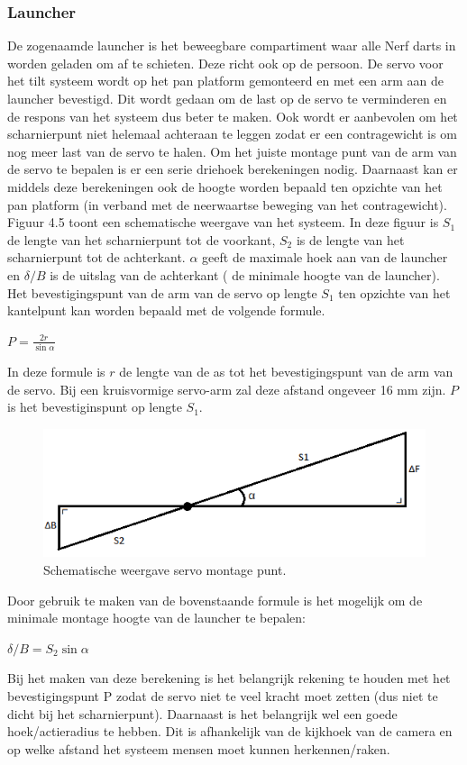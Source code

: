 \subsubsection{Launcher}

De zogenaamde launcher is het beweegbare compartiment waar alle Nerf darts in worden geladen
om af te schieten. Deze richt ook op de persoon.
De servo voor het tilt systeem wordt op het pan platform gemonteerd en met een arm aan de
launcher bevestigd. Dit wordt gedaan om de last op de servo te verminderen en de respons van
het systeem dus beter te maken. Ook wordt er aanbevolen om het scharnierpunt niet helemaal
achteraan te leggen zodat er een contragewicht is om nog meer last van de servo te halen.
Om het juiste montage punt van de arm van de servo te bepalen is er een serie driehoek berekeningen
nodig. Daarnaast kan er middels deze berekeningen ook de hoogte worden bepaald ten
opzichte van het pan platform (in verband met de neerwaartse beweging van het contragewicht).
Figuur 4.5 toont een schematische weergave van het systeem. In deze figuur is $S_1$ de lengte van
het scharnierpunt tot de voorkant, $S_2$ is de lengte van het scharnierpunt tot de achterkant. $\alpha$ geeft
de maximale hoek aan van de launcher en $\delta/B$ is de uitslag van de achterkant ( de minimale hoogte
van de launcher).
Het bevestigingspunt van de arm van de servo op lengte $S_1$ ten opzichte van het kantelpunt kan
worden bepaald met de volgende formule.

$P = \frac{2r}{\sin\alpha}$

In deze formule is $r$ de lengte van de as tot het bevestigingspunt van de arm van de servo. Bij een
kruisvormige servo-arm zal deze afstand ongeveer 16 mm zijn. $P$ is het bevestiginspunt op lengte
$S_1$.

\begin{figure}
    \begin{center}
        \includegraphics[scale=0.5]{figures/kantelpunt_launcher.png}
    \end{center}
    \caption{Schematische weergave servo montage punt.}
    \label{fig:berrLauncher}
\end{figure}

Door gebruik te maken van de bovenstaande formule is het mogelijk om de minimale montage hoogte van de
launcher te bepalen:

$\delta/B = S_2 \sin\alpha$

Bij het maken van deze berekening is het belangrijk rekening te houden met het bevestigingspunt
P zodat de servo niet te veel kracht moet zetten (dus niet te dicht bij het scharnierpunt). Daarnaast
is het belangrijk wel een goede hoek/actieradius te hebben. Dit is afhankelijk van de kijkhoek
van de camera en op welke afstand het systeem mensen moet kunnen herkennen/raken.
